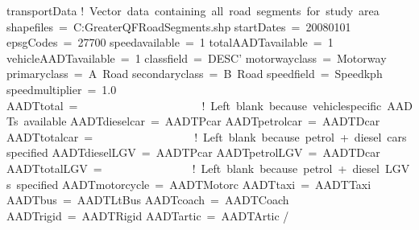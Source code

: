 \documentclass[letterpaper,10pt,english]{sphinxmanual}
\begin{document}
%
\begin{sphinxVerbatim}[commandchars=\\\{\}]
\PYGZam{}transportData
    ! Vector data containing all road segments for study area
    shapefiles = \PYGZsq{}C:\PYGZbs{}GreaterQF\PYGZbs{}RoadSegments.shp\PYGZsq{}
    startDates = \PYGZsq{}2008\PYGZhy{}01\PYGZhy{}01\PYGZsq{}
    epsgCodes = 27700
    speed\PYGZus{}available = 1
    total\PYGZus{}AADT\PYGZus{}available = 1
    vehicle\PYGZus{}AADT\PYGZus{}available = 1
    class\PYGZus{}field = \PYGZsq{}DESC\PYGZus{}’
    motorway\PYGZus{}class = \PYGZsq{}Motorway\PYGZsq{}
    primary\PYGZus{}class = \PYGZsq{}A Road\PYGZsq{}
    secondary\PYGZus{}class = \PYGZsq{}B Road\PYGZsq{}
    speed\PYGZus{}field = \PYGZsq{}Speed\PYGZus{}kph\PYGZsq{}
    speed\PYGZus{}multiplier = 1.0
    AADT\PYGZus{}total = \PYGZsq{}\PYGZsq{}                     ! Left blank because vehicle\PYGZhy{}specific AADTs available
    AADT\PYGZus{}diesel\PYGZus{}car = \PYGZsq{}AADTPcar\PYGZsq{}
    AADT\PYGZus{}petrol\PYGZus{}car = \PYGZsq{}AADTDcar\PYGZsq{}
    AADT\PYGZus{}total\PYGZus{}car = \PYGZsq{}\PYGZsq{}                 ! Left blank because petrol + diesel cars specified
    AADT\PYGZus{}diesel\PYGZus{}LGV = \PYGZsq{}AADTPcar\PYGZsq{}
    AADT\PYGZus{}petrol\PYGZus{}LGV = \PYGZsq{}AADTDcar\PYGZsq{}
    AADT\PYGZus{}total\PYGZus{}LGV = \PYGZsq{}\PYGZsq{}               ! Left blank because petrol + diesel LGVs specified
    AADT\PYGZus{}motorcycle = \PYGZsq{}AADTMotorc\PYGZsq{}
    AADT\PYGZus{}taxi = \PYGZsq{}AADTTaxi\PYGZsq{}
    AADT\PYGZus{}bus = \PYGZsq{}AADTLtBus\PYGZsq{}
    AADT\PYGZus{}coach = \PYGZsq{}AADTCoach\PYGZsq{}
    AADT\PYGZus{}rigid = \PYGZsq{}AADTRigid\PYGZsq{}
    AADT\PYGZus{}artic = \PYGZsq{}AADTArtic\PYGZsq{}
/
\end{sphinxVerbatim}

\end{document}
